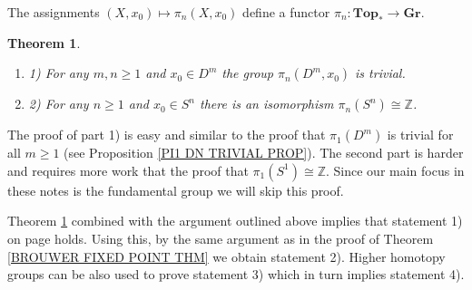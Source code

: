 \documentclass[11pt, letterpaper, oneside]{report}
\theoremstyle{pplain}
\newtheorem{theorem}{Theorem}[chapter]
\theoremstyle{ddefinition}
\theoremstyle{nnn}
\theoremstyle{eexercise}
\newcommand{\Z}{{\mathbb Z}}
\newcommand{\Gr}{{\mathbf{Gr}}}
\newcommand{\Top}{{\mathbf{Top}}}
\newcommand{\benu}{\begin{enumerate}}
\newcommand{\eenu}{\end{enumerate}}
\begin{document}
The assignments $(X, x_{0}) \mapsto \pi_{n}(X, x_{0})$ define a functor
$\pi_{n} \colon\Top_{\ast} \to \Gr$.

\begin{theorem}
\label{PIN SN THM}
\ 

\benu
\item[1)] For any $m, n\geq 1$ and $x_{0}\in D^{m}$ the group $\pi_{n}(D^{m}, x_{0})$ is trivial. 
\item[2)] For any $n\geq 1$ and $x_{0}\in S^{n}$ there is an isomorphism $\pi_{n}(S^{n})\cong \Z$.  
\eenu
\end{theorem}

The proof of part 1) is easy and similar to the proof that $\pi_{1}(D^{m})$ is trivial for all $m\geq 1$
(see Proposition \ref{PI1 DN TRIVIAL PROP}). The second part is harder and requires  more work 
that the proof that $\pi_{1}(S^{1}) \cong \Z$.  Since our main focus in these notes is the fundamental group 
we will skip this proof. 

Theorem \ref{PIN SN THM} combined with the argument outlined above implies that  statement 1) on page \pageref{GENERAL BROUWER PAGE} holds. Using this, by the same argument as in the proof of  
Theorem \ref{BROUWER FIXED POINT THM}  we obtain statement 2). Higher homotopy groups can be also 
used to prove statement 3) which in turn implies statement 4). 
\end{document}
